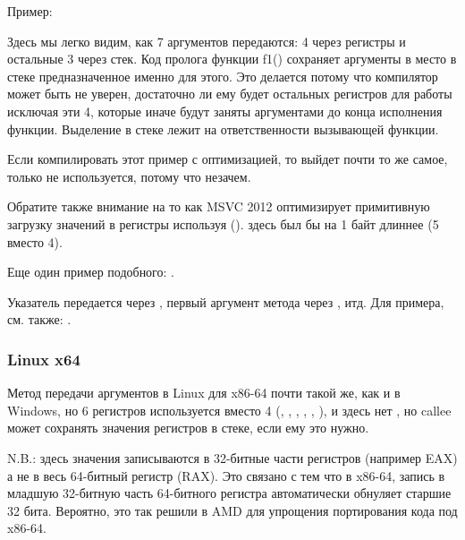 Пример:





Здесь мы легко видим, как 7 аргументов передаются: 4 через регистры и остальные 3 через стек.
Код пролога функции f1() сохраняет аргументы в \EMDASH{}место в стеке предназначенное
именно для этого.
Это делается потому что компилятор может быть не уверен, достаточно ли ему будет остальных регистров
для работы исключая эти 4, которые иначе будут заняты аргументами до конца исполнения функции.
Выделение  в стеке лежит на ответственности вызывающей функции.



Если компилировать этот пример с оптимизацией, то выйдет почти то же самое, 
только  не используется, потому что незачем.

\label{using_MOV_and_pack_of_LEA_to_load_values}
Обратите также внимание на то как MSVC 2012 оптимизирует примитивную загрузку значений в регистры
используя \LEA ().
 здесь был бы на 1 байт длиннее (5 вместо 4).

Еще один пример подобного: .


Указатель \ITthis передается через \RCX, первый аргумент метода через \RDX, итд.
Для примера, см. также: .
 
\subsubsection{Linux x64}

Метод передачи аргументов в Linux для x86-64 почти такой же, как и в Windows, но 6 регистров
используется вместо 4 (\RDI, \RSI, \RDX, \RCX, , ), и здесь нет , 
но \gls{callee} может сохранять значения регистров в стеке, если ему это нужно.



N.B.: здесь значения записываются в 32-битные части регистров (например EAX) а не в весь 64-битный
регистр (RAX).
Это связано с тем что в x86-64,
запись в младшую 32-битную часть 64-битного регистра автоматически обнуляет старшие 32 бита.
Вероятно, это так решили в AMD для упрощения портирования кода под x86-64.

